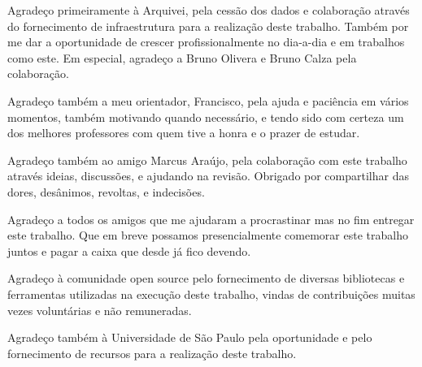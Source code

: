 
Agradeço primeiramente à Arquivei, pela cessão dos dados e colaboração através do fornecimento de infraestrutura para a realização deste trabalho. Também por me dar a oportunidade de crescer profissionalmente no dia-a-dia e em trabalhos como este. Em especial, agradeço a Bruno Olivera e Bruno Calza pela colaboração.

Agradeço também a meu orientador, Francisco, pela ajuda e paciência em vários momentos, também motivando quando necessário, e tendo sido com certeza um dos melhores professores com quem tive a honra e o prazer de estudar.

Agradeço também ao amigo Marcus Araújo, pela colaboração com este trabalho através ideias, discussões, e ajudando na revisão. Obrigado por compartilhar das dores, desânimos, revoltas, e indecisões.

Agradeço a todos os amigos que me ajudaram a procrastinar mas no fim entregar este trabalho. Que em breve possamos presencialmente comemorar este trabalho juntos e pagar a caixa que desde já fico devendo.

Agradeço à comunidade open source pelo fornecimento de diversas bibliotecas e ferramentas utilizadas na execução deste trabalho, vindas de contribuições muitas vezes voluntárias e não remuneradas.

Agradeço também à Universidade de São Paulo pela oportunidade e pelo fornecimento de recursos para a realização deste trabalho.

